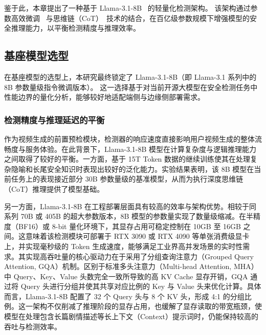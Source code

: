 鉴于此，本章提出了一种基于 Llama-3.1-8B~\cite{grattafiori2024llama}  的轻量化检测架构。
该架构通过参数高效微调~\cite{hu2022lora} 与思维链（CoT）~\cite{wei2022chain}技术的结合，在百亿级参数规模下增强模型的安全推理能力，以平衡检测精度与推理效率。

\subsection{基座模型选型}

在基座模型的选型上，本研究最终锁定了 Llama-3.1-8B（即 Llama-3.1 系列中的 8B 参数量级指令微调版本）。
这一选择基于对当前开源大模型在安全检测任务中性能边界的量化分析，能够较好地适配端侧与边缘侧部署需求。

\subsubsection{检测精度与推理延迟的平衡}

作为视频生成的前置预检模块，检测器的响应速度直接影响用户视频生成的整体流畅度与服务体验。在此背景下，Llama-3.1-8B 模型在计算复杂度与逻辑推理能力之间取得了较好的平衡。一方面，基于 15T Token 数据的继续训练使其在处理复杂隐喻和长尾安全知识时表现出较好的泛化能力。实验结果表明，该 8B 模型在当前任务上的表现接近部分 30B 参数量级的基准模型，从而为执行深度思维链（CoT）推理提供了模型基础。

另一方面，Llama-3.1-8B 在工程部署层面具有较高的效率与架构优势。相较于同系列 70B 或 405B 的超大参数版本，8B 模型的参数量实现了数量级缩减。在半精度（BF16）或 8-bit 量化环境下，其显存占用可稳定控制在 10GB 至 16GB 之间。这意味着该检测模块可部署于 RTX 3090 或 RTX 4090 等单张消费级显卡上，并实现毫秒级的 Token 生成速度，能够满足工业界高并发场景的实时性需求。其实现高吞吐量的核心驱动力在于采用了分组查询注意力（Grouped Query Attention, GQA）机制。区别于标准多头注意力（Multi-head Attention, MHA）中 Query、Key、Value 头数完全一致所导致的高 KV Cache 显存开销，GQA 通过将 Query 头进行分组并使其共享对应比例的 Key 与 Value 头来优化计算。具体而言，Llama-3.1-8B 配置了 32 个 Query 头与 8 个 KV 头，形成 4:1 的分组比例。这一架构不仅削减了推理阶段的显存占用，也缓解了显存读取的带宽瓶颈，使模型在处理包含长篇剧情描述等长上下文（Context）提示词时，仍能保持较高的吞吐与检测效率。


